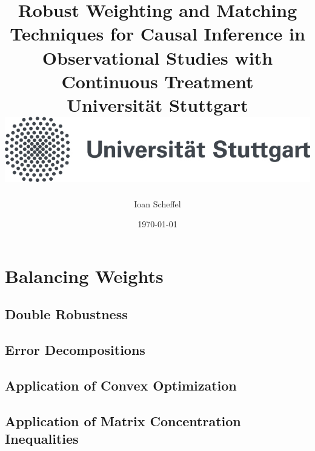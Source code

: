 \documentclass[11pt, a4paper, BCOR=10mm, DIV=11]{scrbook}
\title{
  {
    Robust Weighting and Matching Techniques for Causal Inference in Observational Studies with Continuous Treatment
  }
  \\
  {\large Universität Stuttgart}
  \\
  {\includegraphics{unistuttgart_logo_deutsch.jpg}}
}
\author{Ioan Scheffel}
\date{\today}
\theoremstyle{definition}
\theoremstyle{plain}
\begin{document}
\listoftodos

\maketitle

\tableofcontents 

%
%

\chapter{Balancing Weights}
  \section{Double Robustness}
  
  \section{Error Decompositions}
  
  \section{Application of Convex Optimization}
  
  \section{Application of Matrix Concentration Inequalities}
  
\end{document}
